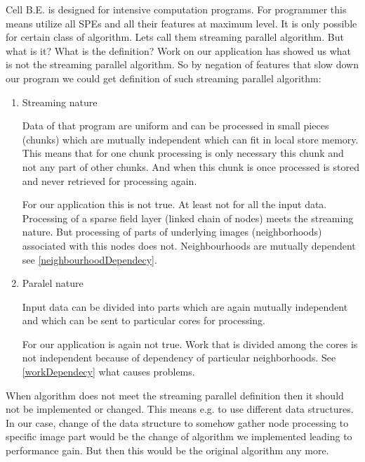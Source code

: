 \par
Cell B.E. is designed for intensive computation programs.
For programmer this means utilize all SPEs and all their features at maximum level.
It is only possible for certain class of algorithm.
Lets call them streaming parallel algorithm.
But what is it? What is the definition?
Work on our application has showed us what is not the streaming parallel algorithm.
So by negation of features that slow down our program we could get definition of such streaming parallel algorithm:
\begin{enumerate}

\item{Streaming nature}
\par
Data of that program are uniform and can be processed in small pieces (chunks) which are mutually independent which can fit in local store memory.
This means that for one chunk processing is only necessary this chunk and not any part of other chunks.
And when this chunk is once processed is stored and never retrieved for processing again.

\par
For our application this is not true.
At least not for all the input data.
Processing of a sparse field layer (linked chain of nodes) meets the streaming nature.
But processing of parts of underlying images (neighborhoods) associated with this nodes does not.
Neighbourhoods are mutually dependent see \ref{neighbourhoodDependecy}.

\item{Paralel nature}
\par
Input data can be divided into parts which are again mutually independent and which can be sent to particular cores for processing.

\par
For our application is again not true.
Work that is divided among the cores is not independent because of dependency of particular neighborhoods.
See \ref{workDependecy} what causes problems.

\end{enumerate}

\par
When algorithm does not meet the streaming parallel definition then it should not be implemented or changed.
This means e.g. to use different data structures.
In our case, change of the data structure to somehow gather node processing to specific image part would be the change of algorithm we implemented leading to performance gain.
But then this would be the original algorithm any more.

